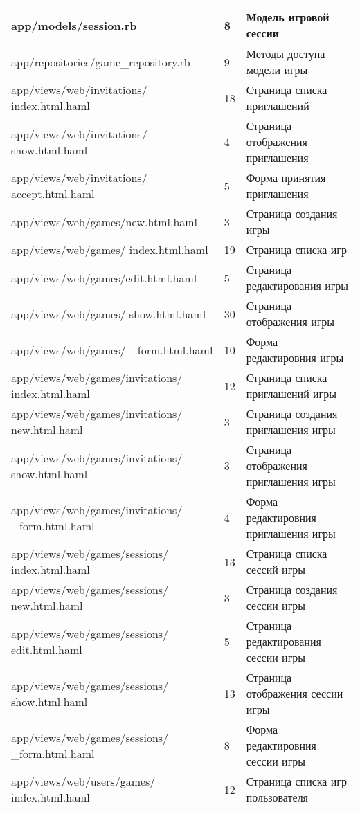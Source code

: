 \begin{longtable}[h]{| p{} | p{} | p{} |}
  \hline
  app/models/session.rb   &   8  &  Модель игровой сессии \\
  \hline
  app/repositories/game\_repository.rb   &   9  &  Методы доступа модели игры \\
  \hline
  app/views/web/invitations/ index.html.haml   &   18  &  Страница списка приглашений \\
  \hline
  app/views/web/invitations/ show.html.haml   &   4  &  Страница отображения приглашения \\
  \hline
  app/views/web/invitations/ accept.html.haml   &   5  &  Форма принятия приглашения \\
  \hline
  app/views/web/games/new.html.haml   &   3  &  Страница создания игры \\
  \hline
  app/views/web/games/ index.html.haml   &   19  &  Страница списка игр \\
  \hline
  app/views/web/games/edit.html.haml   &   5  &  Страница редактирования игры \\
  \hline
  app/views/web/games/ show.html.haml   &   30  &  Страница отображения игры\\
  \hline
  app/views/web/games/ \_form.html.haml   &   10  &  Форма редактировния игры \\
  \hline
  app/views/web/games/invitations/ index.html.haml   &   12  &  Страница списка приглашений игры \\
  \hline
  app/views/web/games/invitations/ new.html.haml   &   3  &  Страница создания приглашения игры \\
  \hline
  app/views/web/games/invitations/ show.html.haml   &   3  &  Страница отображения приглашения игры \\
  \hline
  app/views/web/games/invitations/ \_form.html.haml   &   4  &  Форма редактировния приглашения игры \\
  \hline
  app/views/web/games/sessions/ index.html.haml   &   13  &  Страница списка сессий игры \\
  \hline
  app/views/web/games/sessions/ new.html.haml   &   3  &  Страница создания сессии игры \\
  \hline
  app/views/web/games/sessions/ edit.html.haml   &   5  &  Страница редактирования сессии игры \\
  \hline
  app/views/web/games/sessions/ show.html.haml   &   13  &  Страница отображения сессии игры \\
  \hline
  app/views/web/games/sessions/ \_form.html.haml   &   8  &  Форма редактировния сессии игры \\
  \hline
  app/views/web/users/games/ index.html.haml   &   12  &  Страница списка игр пользователя \\
  \hline
\end{longtable}

